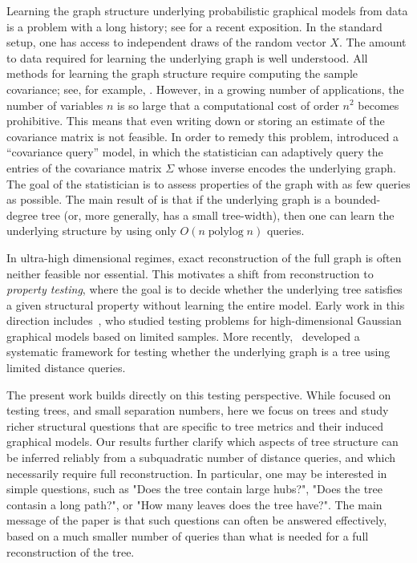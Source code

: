 \documentclass[12pt]{article}
\DeclareMathOperator{\polylog}{polylog}
\begin{document}
Learning the graph structure underlying probabilistic graphical models from data
is a problem with a long history; see \citet{drton2017structure} for a recent exposition. 
In the standard setup, one has access to independent draws of the random vector $X$.
The amount to data required for learning the
underlying graph is well understood. All methods for learning the graph structure require computing the sample covariance; see, for example, \citet{cai2016estimating,dasarathy2016active}. 
However, in a growing number of applications, the number of variables $n$ is so
large that a computational cost of order $n^2$ becomes
prohibitive. This means that even writing down or storing 
an estimate of the covariance matrix  is not feasible.
In order to remedy this problem,
\citet{lugosi2021learning} introduced 
a ``covariance query'' model, in which the statistician can adaptively query the entries of the covariance matrix
$\Sigma$ whose inverse encodes the underlying graph. The goal of the statistician is to assess properties
of the graph with as few queries as possible.
The main result of  \citet{lugosi2021learning} is that if the underlying graph is a 
bounded-degree tree (or, more generally, has a small tree-width), then
one can learn the underlying structure by using only $O(n\polylog n)$ queries.

In ultra-high dimensional regimes, exact reconstruction of the full graph is often neither feasible nor essential. This motivates a shift from reconstruction to \emph{property testing}, where the goal is to decide whether the underlying tree satisfies a given structural property without learning the entire model. Early work in this direction includes~\citet{neykov2019combinatorial}, who studied testing problems for high-dimensional Gaussian graphical models based on limited samples. More recently,~\citet{devroye2024property} developed a systematic framework for testing whether the underlying graph is a tree using limited distance queries.

The present work builds directly on this testing perspective. While \cite{devroye2024property} focused on testing trees, and small separation numbers, here we focus on trees and study richer structural questions that are specific to tree metrics and their induced graphical models. Our results further clarify which aspects of tree structure can be inferred reliably from a subquadratic number of distance queries, and which necessarily require full reconstruction. 
In particular, one may be interested in simple questions, such as "Does the tree contain large hubs?", 
"Does the tree contasin a long path?", or "How many leaves does the tree have?". The main message of the paper is that such questions can often be answered effectively, based on a much smaller number of queries than what is needed for a full reconstruction of the tree.
\end{document}
